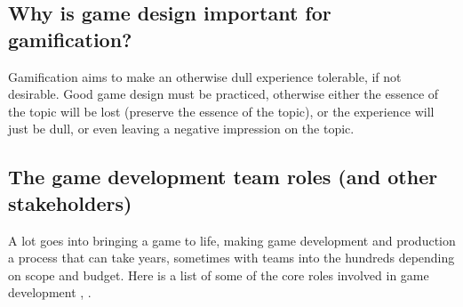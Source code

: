 \documentclass[../main.tex]{subfiles}
\begin{document}
\subsection{Why is game design important for gamification?}
Gamification aims to make an otherwise dull experience tolerable, if not desirable. Good game design must be practiced, otherwise either the essence of the topic will be lost (preserve the essence of the topic), or the experience will just be dull, or even leaving a negative impression on the topic.


\subsection{The game development team roles (and other stakeholders)}
A lot goes into bringing a game to life, making game development and production a process that can take years, sometimes with teams into the hundreds depending on scope and budget. Here is a list of some of the core roles involved in game development \cite{12}, \cite{13}.
\end{document}
